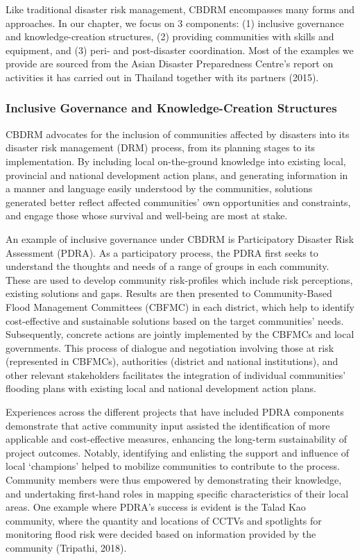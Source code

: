 Like traditional disaster risk management, CBDRM encompasses many forms and approaches. In our chapter, we focus on 3 components: (1) inclusive governance and knowledge-creation structures, (2) providing communities with skills and equipment, and (3) peri- and post-disaster coordination. Most of the examples we provide are sourced from the Asian Disaster Preparedness Centre’s report on activities it has carried out in Thailand together with its partners (2015). 

\subsubsection{Inclusive Governance and Knowledge-Creation Structures} 

CBDRM advocates for the inclusion of communities affected by disasters into its disaster risk management (DRM) process, from its planning stages to its implementation. By including local on-the-ground knowledge into existing local, provincial and national development action plans,  and generating information in a manner and language easily understood by the communities, solutions generated better reflect affected communities’ own opportunities and constraints, and engage those whose survival and well-being are most at stake.

An example of inclusive governance under CBDRM is Participatory Disaster Risk Assessment (PDRA). As a participatory process, the PDRA first seeks to understand the thoughts and needs of a range of groups in each community. These are used to develop community risk-profiles which include risk perceptions, existing solutions and gaps. Results are then presented to Community-Based Flood Management Committees (CBFMC) in each district, which help to identify cost-effective and sustainable solutions based on the target communities’ needs. Subsequently, concrete actions are jointly implemented by the CBFMCs and local governments. This process of dialogue and negotiation involving those at risk (represented in CBFMCs), authorities (district and national institutions), and other relevant stakeholders facilitates the integration of individual communities’ flooding plans with existing local and national development action plans. 

Experiences across the different projects that have included PDRA components demonstrate that active community input assisted the identification of more applicable and cost-effective measures, enhancing the long-term sustainability of project outcomes. Notably, identifying and enlisting the support and influence of local ‘champions’ helped to mobilize communities to contribute to the process. Community members were thus empowered by demonstrating their knowledge, and undertaking first-hand roles in mapping specific characteristics of their local areas. One example where PDRA’s success is evident is the Talad Kao community, where the quantity and locations of CCTVs and spotlights for monitoring flood risk were decided based on information provided by the community (Tripathi, 2018). 

